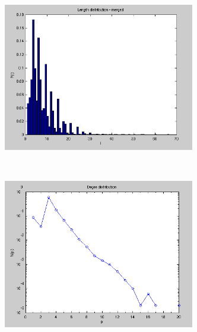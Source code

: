 \begin{figure}[H]
  \centering
  \begin{subfigure}{0.5\textwidth}
    \centering
    \includegraphics[width=0.92\textwidth]{Figures/chapter-image/avizo/ActinZ39b21l5-histo-length.png}%
    \label{avizo305-length}
  \end{subfigure}\\[1ex]
  \begin{subfigure}{0.5\textwidth}
    \centering
    \includegraphics[width=0.92\textwidth]{Figures/chapter-image/avizo/ActinZ39b21l5-histo-degree.png}%
    \label{avizo305-degree}
  \end{subfigure}\\[1ex]
  \begin{subfigure}{0.5\textwidth}
    \centering

\end{subfigure}
\end{figure}
